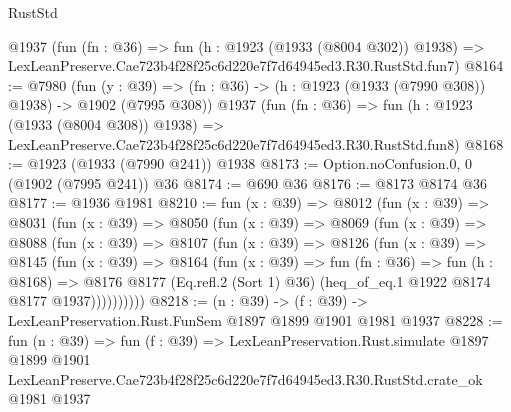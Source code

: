 \begin{lexlean}{RustStd}
\begin{coremodule}
    @1937
    (fun (fn : @36) =>
    fun (h : @1923 (@1933 (@8004 @302)) @1938) =>
    LexLeanPreserve.Cae723b4f28f25c6d220e7f7d64945ed3.R30.RustStd.fun7)
@8164 := @7980
    (fun (y : @39) => (fn : @36) -> (h : @1923 (@1933 (@7990 @308)) @1938) -> @1902 (@7995 @308))
    @1937
    (fun (fn : @36) =>
    fun (h : @1923 (@1933 (@8004 @308)) @1938) =>
    LexLeanPreserve.Cae723b4f28f25c6d220e7f7d64945ed3.R30.RustStd.fun8)
@8168 := @1923 (@1933 (@7990 @241)) @1938
@8173 := Option.noConfusion.{0, 0} (@1902 (@7995 @241)) @36
@8174 := @690 @36
@8176 := @8173 @8174 @36
@8177 := @1936 @1981
@8210 := fun (x : @39) =>
  @8012
    (fun (x : @39) =>
    @8031
      (fun (x : @39) =>
      @8050
        (fun (x : @39) =>
        @8069
          (fun (x : @39) =>
          @8088
            (fun (x : @39) =>
            @8107
              (fun (x : @39) =>
              @8126
                (fun (x : @39) =>
                @8145
                  (fun (x : @39) =>
                  @8164
                    (fun (x : @39) =>
                    fun (fn : @36) =>
                    fun (h : @8168) =>
                    @8176
                      @8177
                      (Eq.refl.{2} (Sort 1) @36)
                      (heq_of_eq.{1} @1922 @8174 @8177 @1937))))))))))
@8218 := (n : @39) -> (f : @39) -> LexLeanPreservation.Rust.FunSem @1897 @1899 @1901 @1981 @1937
@8228 := fun (n : @39) =>
  fun (f : @39) =>
  LexLeanPreservation.Rust.simulate
    @1897
    @1899
    @1901
    LexLeanPreserve.Cae723b4f28f25c6d220e7f7d64945ed3.R30.RustStd.crate_ok
    @1981
    @1937
\end{coremodule}
\end{lexlean}
